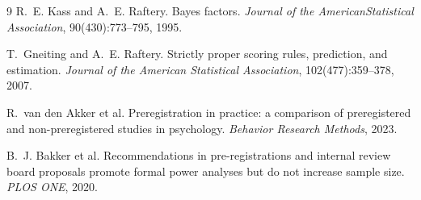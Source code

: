 \documentclass[11pt,letterpaper]{article}
\newcommand{\bs}{\allowbreak\hspace{0pt}}
\begin{document}
\begin{thebibliography}{9}
R.~E. Kass and A.~E. Raftery.
Bayes factors.
\emph{Journal of the American\bs Statistical Association}, 90(430):773--795, 1995.

T.~Gneiting and A.~E. Raftery.
Strictly proper scoring rules, prediction, and estimation.
\emph{Journal of the American Statistical Association}, 102(477):359--378, 2007.

R.~van den Akker et al.
Preregistration in practice: a comparison of preregistered and
non-preregistered studies in psychology.
\emph{Behavior Research Methods}, 2023.

B.~J. Bakker et al.
Recommendations in pre-registrations and internal review board proposals
promote formal power analyses but do not increase sample size.
\emph{PLOS ONE}, 2020.

\end{thebibliography}
\end{document}
